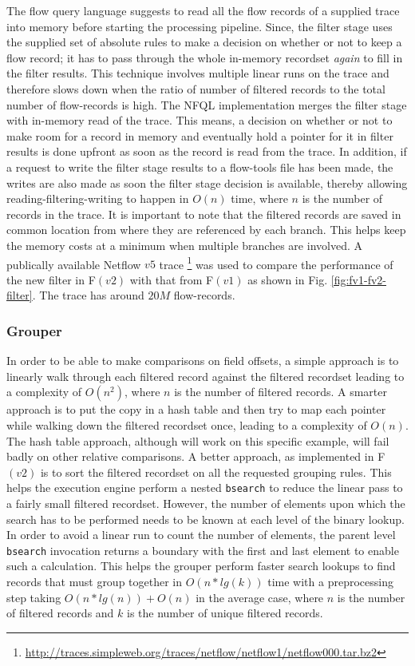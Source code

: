 The flow query language suggests to read all the flow records of a supplied
trace into memory before starting the processing pipeline.  Since, the filter
stage uses the supplied set of absolute rules to make a decision on whether or
not to keep a flow record; it has to pass through the whole in-memory
recordset \emph{again} to fill in the filter results. This technique involves
multiple linear runs on the trace and therefore slows down when the ratio of
number of filtered records to the total number of flow-records is high. The
\ac{NFQL} implementation merges the filter stage with in-memory read of the
trace. This means, a decision on whether or not to make room for a record in
memory and eventually hold a pointer for it in filter results is done upfront
as soon as the record is read from the trace. In addition, if a request to
write the filter stage results to a flow-tools file has been made, the writes
are also made as soon the filter stage decision is available, thereby allowing
reading-filtering-writing to happen in $O(n)$ time, where $n$ is the number of
records in the trace. It is important to note that the filtered records are
saved in common location from where they are referenced by each branch. This
helps keep the memory costs at a minimum when multiple branches are involved.
A publically available Netflow $v5$ trace
\footnote{\url{http://traces.simpleweb.org/traces/netflow/netflow1/netflow000.tar.bz2}}
was used to compare the performance of the new filter in F$(v2)$ with that
from F$(v1)$ as shown in Fig. \ref{fig:fv1-fv2-filter}. The trace has around
$20M$ flow-records.

\subsubsection{Grouper}

In order to be able to make comparisons on field offsets, a simple approach is
to linearly walk through each filtered record against the filtered recordset
leading to a complexity of $O(n^2)$, where $n$ is the number of filtered
records. A smarter approach is to put the copy in a hash table and then try to
map each pointer while walking down the filtered recordset once, leading to a
complexity of $O(n)$. The hash table approach, although will work on this
specific example, will fail badly on other relative comparisons. A better
approach, as implemented in F$(v2)$ is to sort the filtered recordset on all
the requested grouping rules. This helps the execution engine perform a
nested \texttt{bsearch} to reduce the linear pass to a fairly small filtered
recordset. However, the number of elements upon which the search has to be
performed needs to be known at each level of the binary lookup. In order to
avoid a linear run to count the number of elements, the parent level
\texttt{bsearch} invocation returns a boundary with the first and last element
to enable such a calculation. This helps the grouper perform faster search
lookups to find records that must group together in $O(n*lg(k))$ time with a
preprocessing step taking $O(n*lg(n)) + O(n)$ in the average case, where $n$
is the number of filtered records and $k$ is the number of unique filtered
records.

